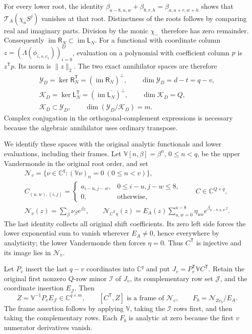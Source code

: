 \documentclass[11pt,a4paper]{article}
\begin{document}
For every lower root, the identity
$\beta_{a-8,u,w}+\beta_{8,r,h}=\beta_{a,u+r,w+h}$ shows that
$\mathcal T_A(\chi_aS^j)$ vanishes at that root. Distinctness of
the roots follows by comparing real and imaginary parts. Division
by the monic $\chi_-$ therefore has zero remainder. Consequently
$\operatorname{im}\mathsf R_N\subset\operatorname{im}\mathsf L_N$.
For a functional with coordinate column
$z=(\Lambda(\phi_{i,s,c_1}))_{i=0}^D$, evaluation on a polynomial
with coefficient column $p$ is $z^{\mathsf T}p$. Its norm is
$\|z\|_2$. The two exact annihilator spaces are therefore
\[
\begin{gathered}
 \mathscr Y_D=\ker\mathsf R_N^{\mathsf T}
    =(\operatorname{im}\overline{\mathsf R_N})^\perp,
       \qquad \dim\mathscr Y_D=d-t=q-v,\\
 \mathscr K_D=\ker\mathsf L_N^{\mathsf T}
    =(\operatorname{im}\overline{\mathsf L_N})^\perp,
       \qquad \dim\mathscr K_D=Q,\\
 \mathscr K_D\subset\mathscr Y_D,\qquad
 \dim(\mathscr Y_D/\mathscr K_D)=m.
\end{gathered}\tag{XIM6}
\]
Complex conjugation in the orthogonal-complement expressions is
necessary because the algebraic annihilator uses ordinary transpose.

We identify these spaces with the original analytic functionals and
lower evaluations, including their frames. Let
$\mathbb V[n,\beta]=\beta^n$, $0\le n<q$, be the upper
Vandermonde in the original root order, and set
\[
\begin{gathered}
 \mathscr N_v=\{\nu\in\mathbb C^q:(\mathbb V\nu)_n=0
                                     \ (0\le n<v)\},\\
 C_{(u,w),(i,j)}=
 \begin{cases}a_{i-u,j-w},&0\le i-u,j-w\le8,\\0,&\text{otherwise},\end{cases}
       \qquad C\in\mathbb C^{Q\times q},\\
 \mathcal N_\nu(z)=\sum_\beta\nu_\beta e^{\beta z},\qquad
 \mathcal N_{C^{\mathsf T}\eta}(z)
   =E_A(z)\sum_{u,w=0}^{a-8}\eta_{uw}e^{\beta_{a-8,u,w}z}.
\end{gathered}\tag{XIM7}
\]
The last identity collects all original shift coefficients. Its zero
left side forces the lower exponential sum to vanish wherever
$E_A\ne0$, hence everywhere by analyticity; the lower Vandermonde
then forces $\eta=0$. Thus $C^{\mathsf T}$ is injective and its
image lies in $\mathscr N_v$.

Let $P_v$ insert the last $q-v$ coordinates into $\mathbb C^q$ and
put $J_v=P_v^{\mathsf T}\mathbb VC^{\mathsf T}$. Retain the original
first nonzero $Q$-row minor $\mathcal I$ of $J_v$, its complementary
row set $\mathcal J$, and the coordinate insertion $E_{\mathcal J}$.
Then
\[
 Z=\mathbb V^{-1}P_vE_{\mathcal J}\in\mathbb C^{q\times m},
 \qquad [C^{\mathsf T},Z]\text{ is a frame of }\mathscr N_v,
 \qquad F_b=\mathcal N_{Ze_b}/E_A.
 \tag{XIM8}
\]
The frame assertion follows by applying $\mathbb V$, taking the
$\mathcal I$ rows first, and then taking the complementary rows.
Each $F_b$ is analytic at zero because the first $v$ numerator
derivatives vanish.
\end{document}
